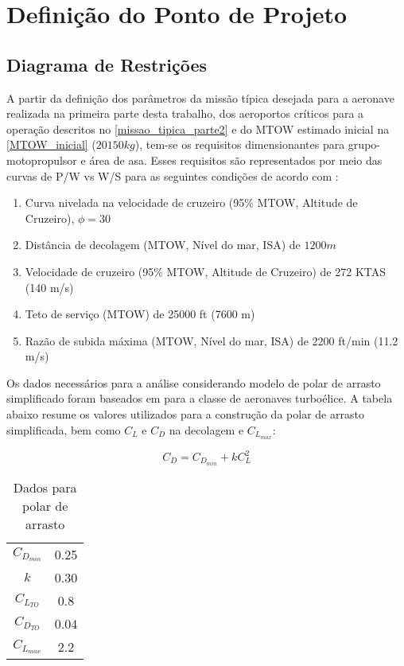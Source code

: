 \chapter{Definição do Ponto de Projeto}
\section{Diagrama de Restrições}
A partir da definição dos parâmetros da missão típica desejada para a aeronave realizada na primeira parte desta trabalho, dos aeroportos críticos para a operação descritos no \autoref{missao_tipica_parte2} e do MTOW estimado inicial na \autoref{MTOW_inicial} ($20150 kg$), tem-se os requisitos dimensionantes para grupo-motopropulsor e área de asa.
Esses requisitos são representados por meio das curvas de P/W vs W/S para as seguintes condições de acordo com \cite{gudmundsson}:
 
\begin{enumerate}

\item Curva nivelada na velocidade de cruzeiro (95\% MTOW, Altitude de Cruzeiro), $\phi = 30$\textdegree\

\item Distância de decolagem (MTOW, Nível do mar, ISA) de $1200 m$

\item Velocidade de cruzeiro (95\% MTOW, Altitude de Cruzeiro) de 272 KTAS (140 m/s)

\item Teto de serviço (MTOW) de 25000 ft (7600 m)

\item Razão de subida máxima (MTOW, Nível do mar, ISA) de 2200 ft/min (11.2 m/s)

\end{enumerate}


Os dados necessários para a análise considerando modelo de polar de arrasto simplificado foram baseados em \cite{gudmundsson} para a classe de aeronaves turboélice.
A tabela abaixo resume os valores utilizados para a construção da polar de arrasto simplificada, bem como $C_L$ e $C_D$ na decolagem e $C_{L_{max}}$:

\begin{equation}
C_D = C_{D_{min}} + k C_L^2
\end{equation}

\begin{table}[H]
\centering
\begin{tabular}{cc}
\toprule
$C_{D_{min}}$ & 0.25 \\
$k$ & 0.30 \\
$C_{L_{TO}}$ & 0.8 \\
$C_{D_{TO}}$  & 0.04 \\
$C_{L_{max}}$ & 2.2 \\
\bottomrule
\end{tabular}
\caption[Dados para polar de arrasto]{Dados para polar de arrasto}
\label{tbl:polar_arrasto}
\end{table}

